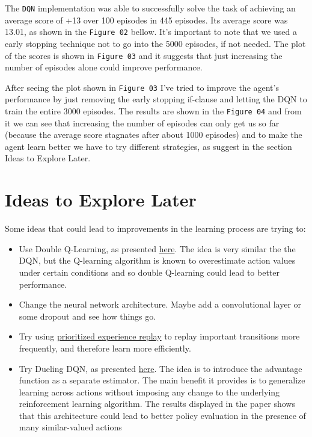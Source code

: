 \documentclass[
]{article}
\begin{document}
The \texttt{DQN} implementation was able to successfully solve the task
of achieving an average score of +13 over 100 episodes in 445 episodes.
Its average score was 13.01, as shown in the \texttt{Figure\ 02} bellow.
It's important to note that we used a early stopping technique not to go
into the 5000 episodes, if not needed. The plot of the scores is shown
in \texttt{Figure\ 03} and it suggests that just increasing the number
of episodes alone could improve performance.

After seeing the plot shown in \texttt{Figure\ 03} I've tried to improve
the agent's performance by just removing the early stopping if-clause
and letting the DQN to train the entire 3000 episodes. The results are
shown in the \texttt{Figure\ 04} and from it we can see that increasing
the number of episodes can only get us so far (because the average score
stagnates after about 1000 episodes) and to make the agent learn better
we have to try different strategies, as suggest in the section Ideas to
Explore Later.

\pagebreak

\hypertarget{ideas-to-explore-later}{%
\section{Ideas to Explore Later}\label{ideas-to-explore-later}}

Some ideas that could lead to improvements in the learning process are
trying to:

\begin{itemize}
\item
  Use Double Q-Learning, as presented
  \href{https://arxiv.org/pdf/1509.06461}{here}. The idea is very
  similar the the DQN, but the Q-learning algorithm is known to
  overestimate action values under certain conditions and so double
  Q-learning could lead to better performance.
\item
  Change the neural network architecture. Maybe add a convolutional
  layer or some dropout and see how things go.
\item
  Try using \href{https://arxiv.org/pdf/1511.05952}{prioritized
  experience replay} to replay important transitions more frequently,
  and therefore learn more efficiently.
\item
  Try Dueling DQN, as presented
  \href{https://arxiv.org/pdf/1511.06581}{here}. The idea is to
  introduce the advantage function as a separate estimator. The main
  benefit it provides is to generalize learning across actions without
  imposing any change to the underlying reinforcement learning
  algorithm. The results displayed in the paper shows that this
  architecture could lead to better policy evaluation in the presence of
  many similar-valued actions
\end{itemize}
\end{document}
